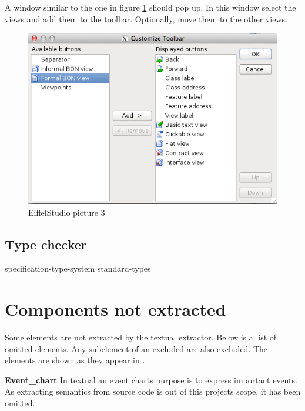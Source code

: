 A window similar to the one in figure \ref{fig:EiffelStudio3} should pop up. In this window select the \bon{} views and add them to the toolbar. Optionally, move them to the other views.

\begin{figure}[H]
\centering
\includegraphics[scale=0.8]{images/es3.png}
\caption{EiffelStudio picture 3}
\label{fig:EiffelStudio3}
\end{figure}

\section{Type checker}

{specification-type-system}
{standard-types}
\chapter{Components not extracted}
\label{components-not-extracted}
Some elements are not extracted by the textual \bon{} extractor. Below is a list of omitted elements. Any subelement of an excluded are also excluded. The elements are shown as they appear in \cite[pp. 352--359]{walden1995}.\newline\newline

\noindent\textbf{Event\_chart}\newline
In textual \bon{} an event charts purpose is to express important events. As extracting semantics from source code is out of this projects scope, it has been omitted.\newline\newline

